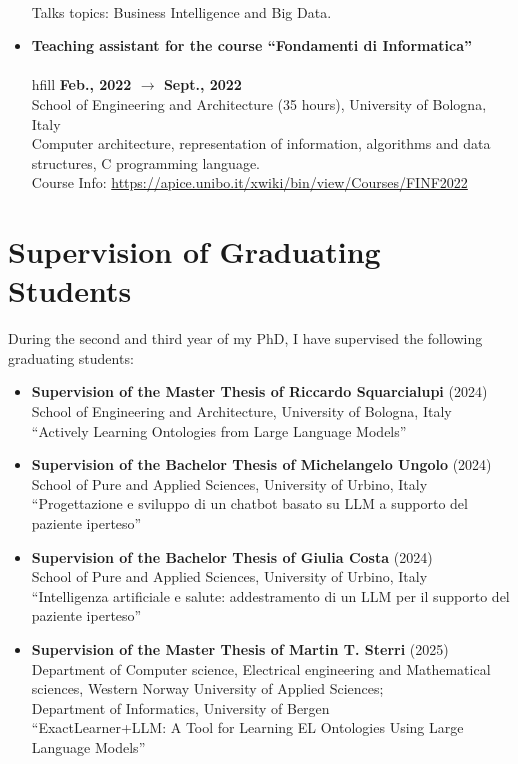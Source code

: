 \documentclass[11pt]{article}
\begin{document}
\begin{itemize}
	\\Talks topics: Business Intelligence and Big Data.
	\item \textbf{ Teaching assistant for the course ``Fondamenti di Informatica'' }
	\\\\hfill \textbf{Feb., 2022 $\rightarrow$ Sept., 2022}
	\\School of Engineering and Architecture (35 hours), University of Bologna, Italy
	\\Computer architecture, representation of information, algorithms and data structures, C programming language.
	\\Course Info: \url{https://apice.unibo.it/xwiki/bin/view/Courses/FINF2022}
\end{itemize}

\section{Supervision of Graduating Students}\label{sec:supervision-of-graduating-students}
%
During the second and third year of my PhD, I have supervised the following graduating students:
%
\begin{itemize}
	\item \textbf{Supervision of the Master Thesis of Riccardo Squarcialupi} (2024)
	\\School of Engineering and Architecture, University of Bologna, Italy
	\\``Actively Learning Ontologies from Large Language Models''
	\item \textbf{Supervision of the Bachelor Thesis of Michelangelo Ungolo} (2024)
	\\School of Pure and Applied Sciences, University of Urbino, Italy
	\\``Progettazione e sviluppo di un chatbot basato su LLM a supporto del paziente iperteso''
	\item \textbf{Supervision of the Bachelor Thesis of Giulia Costa} (2024)
	\\School of Pure and Applied Sciences, University of Urbino, Italy
	\\``Intelligenza artificiale e salute: addestramento di un LLM per il supporto del paziente iperteso''
	\item \textbf{Supervision of the Master Thesis of Martin T. Sterri} (2025)
	\\Department of Computer science, Electrical engineering and Mathematical sciences, Western Norway University of Applied Sciences;
	\\Department of Informatics, University of Bergen
	\\``ExactLearner+LLM: A Tool for Learning EL Ontologies Using Large Language Models''
\end{itemize}
\end{document}
